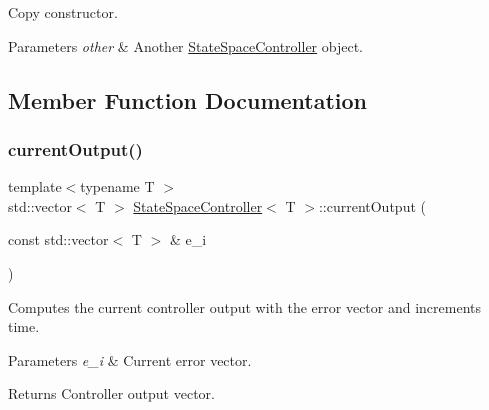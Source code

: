 Copy constructor. 


\begin{DoxyParams}{Parameters}
{\em other} & Another \hyperlink{classStateSpaceController}{State\+Space\+Controller} object. \\
\hline
\end{DoxyParams}


\subsection{Member Function Documentation}
\mbox{\label{classStateSpaceController_a007985a139e8946e1f61e5e402d81d2e}} 
\subsubsection{\texorpdfstring{current\+Output()}{currentOutput()}\hspace{0.1cm}{\footnotesize\ttfamily [1/6]}}
{\footnotesize\ttfamily template$<$typename T $>$ \\
std\+::vector$<$ T $>$ \hyperlink{classStateSpaceController}{State\+Space\+Controller}$<$ T $>$\+::current\+Output (\begin{DoxyParamCaption}\item[{const std\+::vector$<$ T $>$ \&}]{e\+\_\+i }\end{DoxyParamCaption})}



Computes the current controller output with the error vector and increments time. 


\begin{DoxyParams}{Parameters}
{\em e\+\_\+i} & Current error vector. \\
\hline
\end{DoxyParams}
\begin{DoxyReturn}{Returns}
Controller output vector. 
\end{DoxyReturn}
\mbox{\label{classStateSpaceController_a00b5627d37939d059112a16cf1adf7c9}} 
